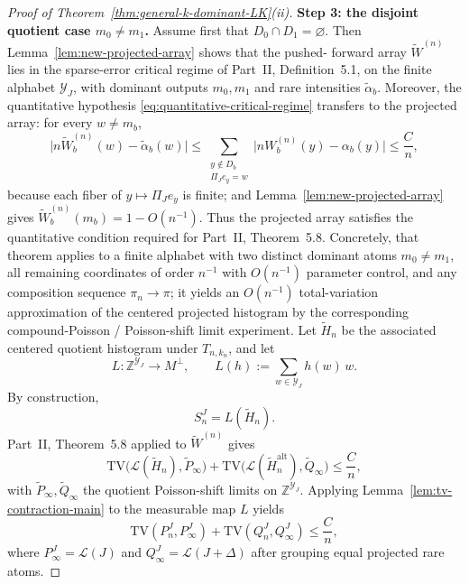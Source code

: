 \documentclass{article}
\newcommand{\TV}{\mathrm{TV}}
\newcommand{\1}{\mathbf 1}
\begin{document}
\begin{proof}[Proof of Theorem~\ref{thm:general-k-dominant-LK}(ii)]
\medskip
\textbf{Step 3: the disjoint quotient case $m_0\neq m_1$.}
Assume first that $D_0\cap D_1=\varnothing$. Then Lemma~\ref{lem:new-projected-array} shows that the pushed-
forward array $\widetilde W^{(n)}$ lies in the sparse-error critical regime of Part~II, Definition~5.1, on the
finite alphabet $\mathcal Y_J$, with dominant outputs $m_0,m_1$ and rare intensities $\widetilde\alpha_b$.
Moreover, the quantitative hypothesis \eqref{eq:quantitative-critical-regime} transfers to the projected array:
for every $w\neq m_b$,
\[
\bigl|n\widetilde W_b^{(n)}(w)-\widetilde\alpha_b(w)\bigr|
\le \sum_{\substack{y\notin D_b\\ \Pi_J e_y=w}} \bigl|nW_b^{(n)}(y)-\alpha_b(y)\bigr|
\le \frac{C}{n},
\]
because each fiber of $y\mapsto \Pi_J e_y$ is finite; and Lemma~\ref{lem:new-projected-array} gives
$\widetilde W_b^{(n)}(m_b)=1-O(n^{-1})$. Thus the projected array satisfies the quantitative condition required
for Part~II, Theorem~5.8. Concretely, that theorem applies to a finite alphabet with two distinct dominant atoms
$m_0\neq m_1$, all remaining coordinates of order $n^{-1}$ with $O(n^{-1})$ parameter control, and any composition
sequence $\pi_n\to\pi$; it yields an $O(n^{-1})$ total-variation approximation of the centered projected histogram
by the corresponding compound-Poisson / Poisson-shift limit experiment. Let $\widetilde H_n$ be the associated
centered quotient histogram under $T_{n,k_n}$, and let
\[
L:\mathbb Z^{\mathcal Y_J}\to M^\perp,
\qquad L(h):=\sum_{w\in\mathcal Y_J} h(w)\,w.
\]
By construction,
\[
S_n^J=L(\widetilde H_n).
\]
Part~II, Theorem~5.8 applied to $\widetilde W^{(n)}$ gives
\[
\TV\bigl(\mathcal L(\widetilde H_n),\widetilde P_\infty\bigr)+
\TV\bigl(\mathcal L(\widetilde H_n^{\mathrm{alt}}),\widetilde Q_\infty\bigr)
\le \frac{C}{n},
\]
with $\widetilde P_\infty,\widetilde Q_\infty$ the quotient Poisson-shift limits on $\mathbb Z^{\mathcal Y_J}$. Applying
Lemma~\ref{lem:tv-contraction-main} to the measurable map $L$ yields
\[
\TV(P_n^J,P_\infty^J)+\TV(Q_n^J,Q_\infty^J)\le \frac{C}{n},
\]
where $P_\infty^J=\mathcal L(J)$ and $Q_\infty^J=\mathcal L(J+\Delta)$ after grouping equal projected rare
atoms.


\end{proof}
\end{document}
